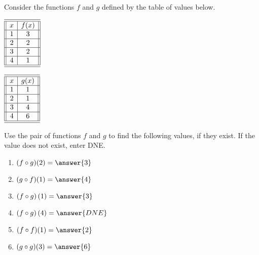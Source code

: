 \documentclass{ximera}
\author{Kenneth Berglund}
\begin{document}
\licenseSZ
\begin{exercise}
Consider the functions $f$ and $g$ defined by the table of values below. \\
		\begin{minipage}{.5\textwidth}
		  	\begin{center}
				$\begin{array}{||c|c||}
					\hline 
					\hline
					x & f(x)\\
					\hline
					1&3\\
					\hline
					2&2\\
					\hline
					3&2\\
					\hline
					4& 1\\
					\hline 
					\hline
				\end{array}$
			\end{center}
		\end{minipage}%
		\begin{minipage}{.5\textwidth}
		  	\begin{center}
				$\begin{array}{||c|c||}
					\hline 
					\hline
					x & g(x)\\
					\hline
					1&1\\
					\hline
					2&1\\
					\hline
					3&4\\
					\hline
					4& 6\\
					\hline 
					\hline
				\end{array}$
			\end{center}
		\end{minipage}
Use the pair of functions $f$ and $g$ to find the following values, if they exist. If the value does not exist, enter DNE.
\begin{enumerate}
\item $(f \circ g)(2) = \answer{3}$
\item $(g \circ f)(1) = \answer{4}$
\item $(f \circ g)\left(1\right) = \answer{3}$
\item $(f\circ g)\left(4\right) = \answer{DNE}$
\item $(f \circ f)(1) = \answer{2}$
\item $(g \circ g)(3) = \answer{6}$
\end{enumerate}

\end{exercise}
\end{document}
